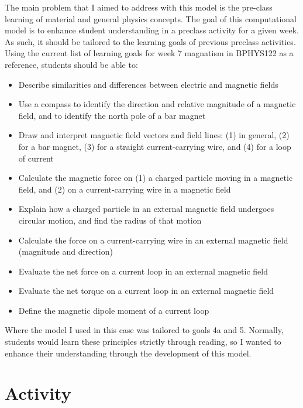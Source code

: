 \documentclass[11pt]{article}
\begin{document}
   	    	The main problem that I aimed to address with this model is the pre-class learning of material and general physics concepts. The goal of this computational model is to enhance student understanding in a preclass activity for a given week. As such, it should be tailored to the learning goals of previous preclass activities. Using the current list of learning goals for week 7 magnatism in BPHYS122 as a reference, students should be able to:
   	    	
   	    	\begin{itemize}
   	    		
   	    		\item Describe similarities and differences between electric and magnetic fields
   	    		\item Use a compass to identify the direction and relative magnitude of a magnetic field, and to identify the north pole of a bar magnet
   	    		\item Draw and interpret magnetic field vectors and field lines: (1) in general, (2) for a bar magnet, (3) for a straight current-carrying wire, and (4) for a loop of current
   	    		\item Calculate the magnetic force on (1) a charged particle moving in a magnetic field, and (2) on a current-carrying wire in a magnetic field
   	    		\item Explain how a charged particle in an external magnetic field undergoes circular motion, and find the radius of that motion
   	    		\item Calculate the force on a current-carrying wire in an external magnetic field (magnitude and direction)
   	    		\item Evaluate the net force on a current loop in an external magnetic field
   	    		\item Evaluate the net torque on a current loop in an external magnetic field
   	    		\item Define the magnetic dipole moment of a current loop
   	    		
   	    	\end{itemize}

   	    	Where the model I used in this case was tailored to goals 4a and 5. Normally, students would learn these principles strictly through reading, so I wanted to enhance their understanding through the development of this model.
   	    	
   	    \section*{Activity}
   	    
\end{document}
